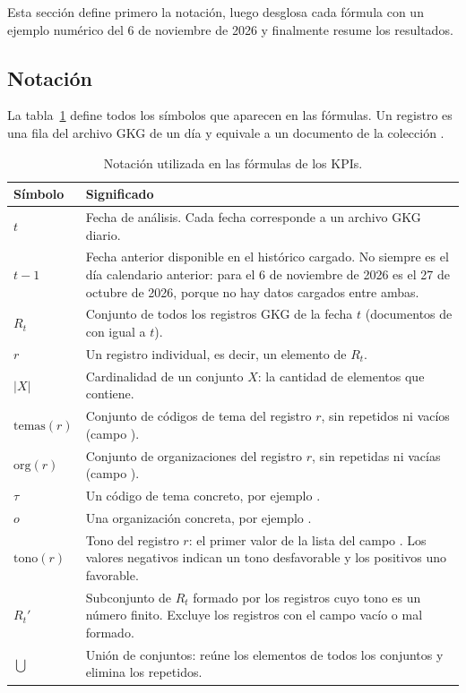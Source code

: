 \documentclass[11pt,a4paper]{article}
\newcommand{\code}[1]{\detokenize{#1}}
\begin{document}
Esta sección define primero la notación, luego desglosa cada fórmula con un ejemplo numérico del 6 de noviembre de 2026 y finalmente resume los resultados.

\subsection{Notación}

La tabla~\ref{tab:notacion} define todos los símbolos que aparecen en las fórmulas. Un registro es una fila del archivo GKG de un día y equivale a un documento de la colección \code{gkg_records}.

\begin{table}[H]
\centering
\small
\begin{tabularx}{\textwidth}{@{}>{\raggedright\arraybackslash}p{2.6cm}>{\raggedright\arraybackslash}X@{}}
\toprule
Símbolo & Significado \\
\midrule
$t$ & Fecha de análisis. Cada fecha corresponde a un archivo GKG diario. \\
$t-1$ & Fecha anterior disponible en el histórico cargado. No siempre es el día calendario anterior: para el 6 de noviembre de 2026 es el 27 de octubre de 2026, porque no hay datos cargados entre ambas. \\
$R_t$ & Conjunto de todos los registros GKG de la fecha $t$ (documentos de \code{gkg_records} con \code{date} igual a $t$). \\
$r$ & Un registro individual, es decir, un elemento de $R_t$. \\
$\lvert X \rvert$ & Cardinalidad de un conjunto $X$: la cantidad de elementos que contiene. \\
$\mathrm{temas}(r)$ & Conjunto de códigos de tema del registro $r$, sin repetidos ni vacíos (campo \code{THEMES}). \\
$\mathrm{org}(r)$ & Conjunto de organizaciones del registro $r$, sin repetidas ni vacías (campo \code{ORGANIZATIONS}). \\
$\tau$ & Un código de tema concreto, por ejemplo \code{EPU_POLICY}. \\
$o$ & Una organización concreta, por ejemplo \code{reuters}. \\
$\mathrm{tono}(r)$ & Tono del registro $r$: el primer valor de la lista del campo \code{TONE}. Los valores negativos indican un tono desfavorable y los positivos uno favorable. \\
$R_t'$ & Subconjunto de $R_t$ formado por los registros cuyo tono es un número finito. Excluye los registros con el campo vacío o mal formado. \\
$\bigcup$ & Unión de conjuntos: reúne los elementos de todos los conjuntos y elimina los repetidos. \\
\bottomrule
\end{tabularx}
\caption{Notación utilizada en las fórmulas de los KPIs.}
\label{tab:notacion}
\end{table}
\end{document}
